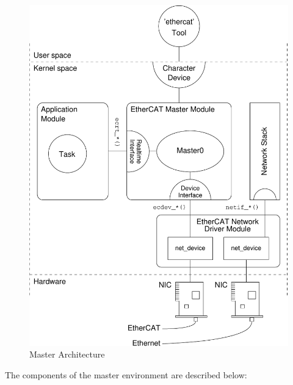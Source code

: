 \documentclass[a4paper,12pt,BCOR6mm,bibtotoc,idxtotoc]{scrbook}
\begin{document}
\begin{figure}[htbp]
  \centering
  \includegraphics[width=.9\textwidth]{images/architecture}
  \caption{Master Architecture}
  \label{fig:arch}
\end{figure}

The components of the master environment are described below:
\end{document}
